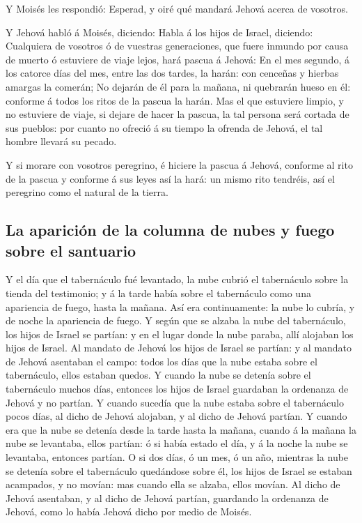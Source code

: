  Y Moisés les respondió: Esperad, y oiré qué mandará
Jehová acerca de vosotros.

 Y Jehová habló á Moisés, diciendo:  Habla
á los hijos de Israel, diciendo: Cualquiera de vosotros ó de vuestras
generaciones, que fuere inmundo por causa de muerto ó estuviere de viaje
lejos, hará pascua á Jehová:  En el mes segundo, á los
catorce días del mes, entre las dos tardes, la harán: con cenceñas y
hierbas amargas la comerán;  No dejarán de él para la
mañana, ni quebrarán hueso en él: conforme á todos los ritos de la
pascua la harán.  Mas el que estuviere limpio, y no
estuviere de viaje, si dejare de hacer la pascua, la tal persona será
cortada de sus pueblos: por cuanto no ofreció á su tiempo la ofrenda de
Jehová, el tal hombre llevará su pecado.

 Y si morare con vosotros peregrino, é hiciere la pascua
á Jehová, conforme al rito de la pascua y conforme á sus leyes así la
hará: un mismo rito tendréis, así el peregrino como el natural de la
tierra.

\hypertarget{la-apariciuxf3n-de-la-columna-de-nubes-y-fuego-sobre-el-santuario}{%
\subsection{La aparición de la columna de nubes y fuego sobre el
santuario}\label{la-apariciuxf3n-de-la-columna-de-nubes-y-fuego-sobre-el-santuario}}

 Y el día que el tabernáculo fué levantado, la nube
cubrió el tabernáculo sobre la tienda del testimonio; y á la tarde había
sobre el tabernáculo como una apariencia de fuego, hasta la mañana.
 Así era continuamente: la nube lo cubría, y de noche la
apariencia de fuego.  Y según que se alzaba la nube del
tabernáculo, los hijos de Israel se partían: y en el lugar donde la nube
paraba, allí alojaban los hijos de Israel.  Al mandato de
Jehová los hijos de Israel se partían: y al mandato de Jehová asentaban
el campo: todos los días que la nube estaba sobre el tabernáculo, ellos
estaban quedos.  Y cuando la nube se detenía sobre el
tabernáculo muchos días, entonces los hijos de Israel guardaban la
ordenanza de Jehová y no partían.  Y cuando sucedía que
la nube estaba sobre el tabernáculo pocos días, al dicho de Jehová
alojaban, y al dicho de Jehová partían.  Y cuando era que
la nube se detenía desde la tarde hasta la mañana, cuando á la mañana la
nube se levantaba, ellos partían: ó si había estado el día, y á la noche
la nube se levantaba, entonces partían.  O si dos días, ó
un mes, ó un año, mientras la nube se detenía sobre el tabernáculo
quedándose sobre él, los hijos de Israel se estaban acampados, y no
movían: mas cuando ella se alzaba, ellos movían.  Al
dicho de Jehová asentaban, y al dicho de Jehová partían, guardando la
ordenanza de Jehová, como lo había Jehová dicho por medio de Moisés.

